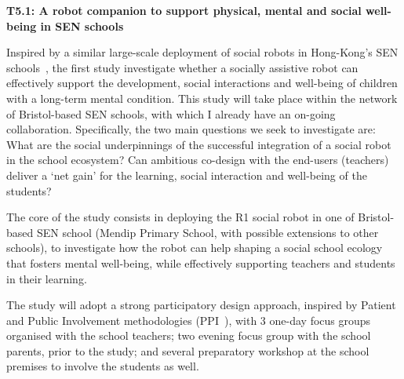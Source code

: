 \begin{rewrite}

\textbf{T5.1: A robot companion to support physical, mental and social
well-being in SEN schools}

Inspired by a similar large-scale deployment of social robots in Hong-Kong's SEN
schools~\cite{robot4sen}, the first study investigate whether a socially
assistive robot can effectively support the development, social
interactions and well-being of children with a long-term mental condition. This
study will take place within the network of Bristol-based SEN schools, with
which I already have an on-going collaboration.  Specifically, the two main
questions we seek to investigate are: What are the social underpinnings of the
successful integration of a social robot in the school ecosystem? Can ambitious
co-design with the end-users (teachers) deliver a `net gain' for the learning,
social interaction and well-being of the students? 

The core of the study consists in deploying the R1 social robot in one of
Bristol-based SEN school (Mendip Primary School, with possible extensions to
other schools), to investigate how the robot can help shaping a social school
ecology that fosters mental well-being, while effectively supporting teachers
and students in their learning. 

The study will adopt a strong participatory design approach, inspired by
Patient and Public Involvement methodologies (PPI~\cite{boivin2010patient}),
with 3 one-day focus groups organised with the school teachers; two evening focus group with the
school parents, prior to the study; and several preparatory workshop at the
school premises to involve the students as well.




\end{rewrite}
